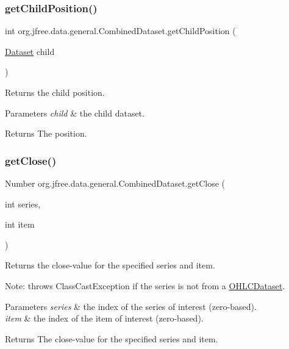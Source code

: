 \subsubsection{\texorpdfstring{get\+Child\+Position()}{getChildPosition()}}
{\footnotesize\ttfamily int org.\+jfree.\+data.\+general.\+Combined\+Dataset.\+get\+Child\+Position (\begin{DoxyParamCaption}\item[{\mbox{\hyperlink{interfaceorg_1_1jfree_1_1data_1_1general_1_1_dataset}{Dataset}}}]{child }\end{DoxyParamCaption})}

Returns the child position.


\begin{DoxyParams}{Parameters}
{\em child} & the child dataset.\\
\hline
\end{DoxyParams}
\begin{DoxyReturn}{Returns}
The position. 
\end{DoxyReturn}
\mbox{\label{classorg_1_1jfree_1_1data_1_1general_1_1_combined_dataset_a7f58c968f7c5b50b3e122c49f5d33069}} 
\subsubsection{\texorpdfstring{get\+Close()}{getClose()}}
{\footnotesize\ttfamily Number org.\+jfree.\+data.\+general.\+Combined\+Dataset.\+get\+Close (\begin{DoxyParamCaption}\item[{int}]{series,  }\item[{int}]{item }\end{DoxyParamCaption})}

Returns the close-\/value for the specified series and item. 

Note\+: throws {\ttfamily Class\+Cast\+Exception} if the series is not from a \mbox{\hyperlink{}{O\+H\+L\+C\+Dataset}}.


\begin{DoxyParams}{Parameters}
{\em series} & the index of the series of interest (zero-\/based). \\
\hline
{\em item} & the index of the item of interest (zero-\/based).\\
\hline
\end{DoxyParams}
\begin{DoxyReturn}{Returns}
The close-\/value for the specified series and item. 
\end{DoxyReturn}



